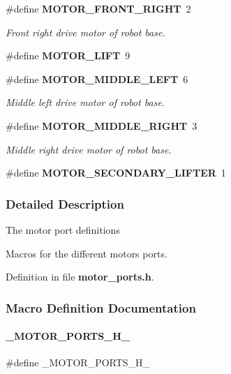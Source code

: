 \begin{DoxyCompactItemize}
\#define \textbf{ M\+O\+T\+O\+R\+\_\+\+F\+R\+O\+N\+T\+\_\+\+R\+I\+G\+HT}~2
\begin{DoxyCompactList}\small\item\em Front right drive motor of robot base. \end{DoxyCompactList}\item 
\#define \textbf{ M\+O\+T\+O\+R\+\_\+\+L\+I\+FT}~9
\item 
\#define \textbf{ M\+O\+T\+O\+R\+\_\+\+M\+I\+D\+D\+L\+E\+\_\+\+L\+E\+FT}~6
\begin{DoxyCompactList}\small\item\em Middle left drive motor of robot base. \end{DoxyCompactList}\item 
\#define \textbf{ M\+O\+T\+O\+R\+\_\+\+M\+I\+D\+D\+L\+E\+\_\+\+R\+I\+G\+HT}~3
\begin{DoxyCompactList}\small\item\em Middle right drive motor of robot base. \end{DoxyCompactList}\item 
\#define \textbf{ M\+O\+T\+O\+R\+\_\+\+S\+E\+C\+O\+N\+D\+A\+R\+Y\+\_\+\+L\+I\+F\+T\+ER}~1
\end{DoxyCompactItemize}


\subsubsection{Detailed Description}
The motor port definitions

Macros for the different motors ports. 



Definition in file \textbf{ motor\+\_\+ports.\+h}.



\subsubsection{Macro Definition Documentation}
\mbox{\label{a00050_a96b0e64c39730b0c4ca0d9e493bc0f58}} 
\paragraph{\+\_\+\+M\+O\+T\+O\+R\+\_\+\+P\+O\+R\+T\+S\+\_\+\+H\+\_\+}
{\footnotesize\ttfamily \#define \+\_\+\+M\+O\+T\+O\+R\+\_\+\+P\+O\+R\+T\+S\+\_\+\+H\+\_\+}



